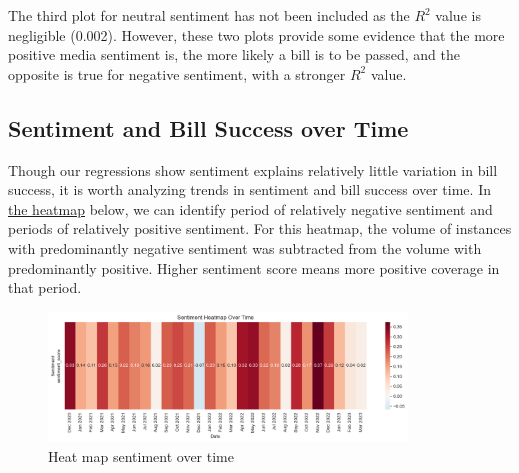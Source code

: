 \documentclass[letterpaper,11pt]{article}
\begin{document}
The third plot for neutral sentiment has not been included as the $R^2$ value is negligible (0.002). However, these two plots provide some evidence that the more positive media sentiment is, the more likely a bill is to be passed, and the opposite is true for negative sentiment, with a stronger $R^2$ value. 







\subsection{Sentiment and Bill Success over Time}
Though our regressions show sentiment explains relatively little variation in bill success, it is worth analyzing trends in sentiment and bill success over time. In \hyperref[fig:heatmap-time]{the heatmap} below, we can identify period of relatively negative sentiment and periods of relatively positive sentiment. For this heatmap, the volume of instances with predominantly negative sentiment was subtracted from the volume with predominantly positive. Higher sentiment score means more positive coverage in that period.

\begin{figure}[htbp]
    \centering
    \includegraphics[width=0.85\textwidth]{figs/fig_8.png}
    \caption{Heat map sentiment over time}
    \label{fig:heatmap-time}
\end{figure}
\end{document}
